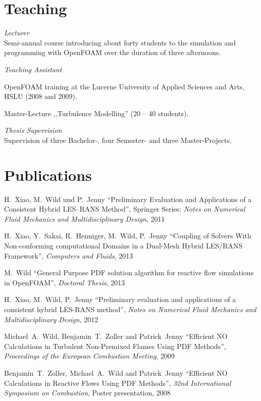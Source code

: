 \documentclass[line,11pt,a4paper]{../resume}
\begin{document}
\begin{resume}
\section{\mysidestyle Teaching}\vspace{2mm}

\textsl{Lecturer}\\
Semi-annual course introducing about forty students to the simulation and
programming with OpenFOAM over the duration of three afternoons.

\textsl{Teaching Assistant}
\begin{list2}
\item OpenFOAM training at the Lucerne University of Applied Sciences and Arts, HSLU
(2008 and 2009).
\item Master-Lecture ,,Turbulence Modelling'' (20 -- 40 students).
\end{list2}

\textsl{Thesis Supervision}\\
Supervision of three Bachelor-, four Semester- and three Master-Projects.

\section{\mysidestyle Publications}\vspace{2mm}
H.~Xiao, M.~Wild und P.~Jenny ``Preliminary Evaluation and
Applications of a Consistent Hybrid LES--RANS Method'', Springer Series:
\textsl{Notes on Numerical Fluid Mechanics and Multidisciplinary Design}, 2011

\vspace{-2mm}
H.~Xiao, Y.~Sakai, R.~Henniger, M.~Wild, P.~Jenny
``Coupling of Solvers With Non-conforming computational Domains in a Dual-Mesh
Hybrid LES/RANS Framework'', \textsl{Computers and Fluids}, 2013

M.~Wild
``General Purpose PDF solution algorithm for reactive flow simulations in
OpenFOAM'', \textsl{Doctoral Thesis}, 2013

\vspace{-2mm}
H.~Xiao, M.~Wild, P.~Jenny
``Preliminary evaluation and applications of a consistent hybrid LES-RANS
method'', \textsl{Notes on Numerical Fluid Mechanics and Multidisciplinary
Design}, 2012

\vspace{-2mm}
Michael~A.~Wild, Benjamin~T.~Zoller and Patrick~Jenny
``Efficient $\mathrm{NO}$ Calculations in Turbulent Non-Premixed Flames Using
PDF Methods'', \textsl{Proceedings of the European Combustion Meeting}, 2009

\vspace{-2mm}
Benjamin~T.~Zoller, Michael~A.~Wild and Patrick~Jenny
``Efficient $\mathrm{NO}$ Calculations in Reactive Flows Using PDF Methods'',
\textsl{32nd International Symposium on Combustion}, Poster presentation, 2008



\end{resume}
\end{document}
